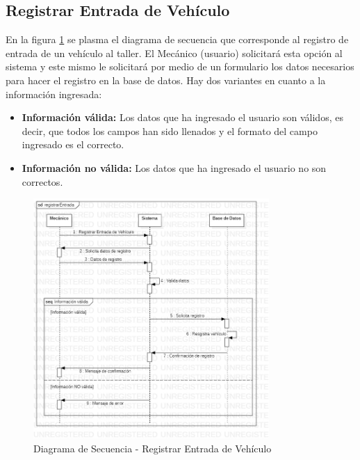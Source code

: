 \subsection{Registrar Entrada de Vehículo}
En la figura \ref{fig:Diagrama de Secuencia - Registrar Entrada de Vehículo} se plasma el diagrama de secuencia que corresponde al registro de entrada de un vehículo al taller. El Mecánico (usuario) solicitará esta opción al sistema y este mismo le solicitará por medio de un formulario los datos necesarios para hacer el registro en la base de datos. Hay dos variantes en cuanto a la información ingresada: 
\begin{itemize}
	\item \textbf{Información válida:} Los datos que ha ingresado el usuario son válidos, es decir, que todos los campos han sido llenados y el formato del campo ingresado es el correcto. 
	\item \textbf{Información no válida:} Los datos que ha ingresado el usuario no son correctos. 
\end{itemize}
\begin{figure}[!h]
	\centering
	\includegraphics[width=0.8\textwidth]{./diseno/vprocesos/imagenes/registrarEntrada}
	\caption{Diagrama de Secuencia - Registrar Entrada de Vehículo}
	\label{fig:Diagrama de Secuencia - Registrar Entrada de Vehículo}
\end{figure}